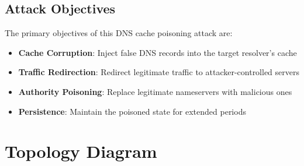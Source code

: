 \documentclass[12pt,a4paper]{article}
\begin{document}
\subsection{Attack Objectives}

The primary objectives of this DNS cache poisoning attack are:

\begin{itemize}
    \item \textbf{Cache Corruption}: Inject false DNS records into the target resolver's cache
    \item \textbf{Traffic Redirection}: Redirect legitimate traffic to attacker-controlled servers
    \item \textbf{Authority Poisoning}: Replace legitimate nameservers with malicious ones
    \item \textbf{Persistence}: Maintain the poisoned state for extended periods
\end{itemize}



\section{Topology Diagram}
\end{document}
